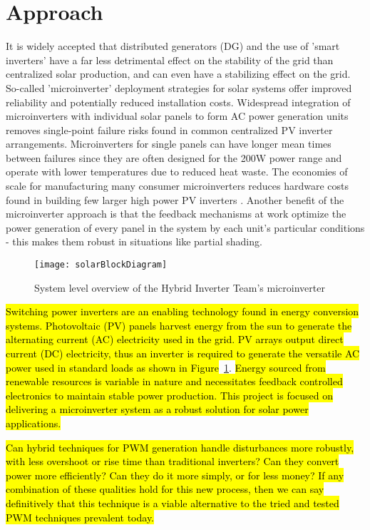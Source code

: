 \section{Approach}
It is widely accepted that distributed generators (DG) and the use of 'smart inverters' have a far less detrimental effect on the stability of the grid than centralized solar production, and can even have a stabilizing effect on the grid. So-called 'microinverter' deployment strategies for solar systems offer improved reliability and potentially reduced installation costs. Widespread integration of microinverters with individual solar panels to form AC power generation units removes single-point failure risks found in common centralized PV inverter arrangements. Microinverters for single panels can have longer mean times between failures since they are often designed for the 200W power range and operate with lower temperatures due to reduced heat waste. The economies of scale for manufacturing many consumer microinverters reduces hardware costs found in building few larger high power PV inverters \cite{microchip}. Another benefit of the microinverter approach is that the feedback mechanisms at work optimize the power generation of every panel in the system by each unit's particular conditions - this makes them robust in situations like partial shading.

\begin{figure}[h]
\centering
\texttt{[image: solarBlockDiagram]}
\caption{System level overview of the Hybrid Inverter Team's microinverter}
\label{solarBlock}
\end{figure}


\hl{Switching power inverters are an enabling technology found in energy conversion systems. Photovoltaic (PV) panels harvest energy from the sun to generate the alternating current (AC) electricity used in the grid. PV arrays output direct current (DC) electricity, thus an inverter is required to generate the versatile AC power used in standard loads as shown in Figure}~\ref{solarBlock}. \hl{Energy sourced from renewable resources is variable in nature and necessitates feedback controlled electronics to maintain stable power production. This project is focused on delivering a microinverter system as a robust solution for solar power applications.}

\hl{Can hybrid techniques for PWM generation handle disturbances more robustly, with less overshoot or rise time than traditional inverters? Can they convert power more efficiently? Can they do it more simply, or for less money? If any combination of these qualities hold for this new process, then we can say definitively that this technique is a viable alternative to the tried and tested PWM techniques prevalent today.}


